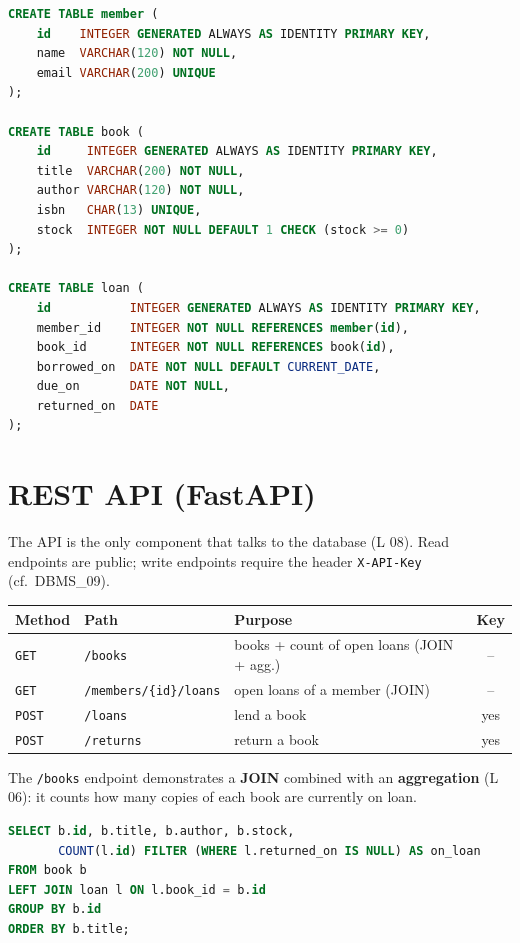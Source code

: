 \documentclass[11pt,a4paper]{article}
\begin{document}
\begin{lstlisting}[language=SQL, caption={init.sql (excerpt) -- schema and seed data}]
CREATE TABLE member (
    id    INTEGER GENERATED ALWAYS AS IDENTITY PRIMARY KEY,
    name  VARCHAR(120) NOT NULL,
    email VARCHAR(200) UNIQUE
);

CREATE TABLE book (
    id     INTEGER GENERATED ALWAYS AS IDENTITY PRIMARY KEY,
    title  VARCHAR(200) NOT NULL,
    author VARCHAR(120) NOT NULL,
    isbn   CHAR(13) UNIQUE,
    stock  INTEGER NOT NULL DEFAULT 1 CHECK (stock >= 0)
);

CREATE TABLE loan (
    id           INTEGER GENERATED ALWAYS AS IDENTITY PRIMARY KEY,
    member_id    INTEGER NOT NULL REFERENCES member(id),
    book_id      INTEGER NOT NULL REFERENCES book(id),
    borrowed_on  DATE NOT NULL DEFAULT CURRENT_DATE,
    due_on       DATE NOT NULL,
    returned_on  DATE
);
\end{lstlisting}

\section{REST API (FastAPI)}

The API is the only component that talks to the database (L 08). Read endpoints
are public; write endpoints require the header \texttt{X-API-Key} (cf.\ DBMS\_09).

\renewcommand{\arraystretch}{1.2}
\begin{tabularx}{\linewidth}{@{}p{1.6cm}p{4.4cm}Xc@{}}
\toprule
\textbf{Method} & \textbf{Path} & \textbf{Purpose} & \textbf{Key} \\
\midrule
\texttt{GET}  & \texttt{/books} & books + count of open loans (JOIN + agg.) & -- \\
\texttt{GET}  & \texttt{/members/\{id\}/loans} & open loans of a member (JOIN) & -- \\
\texttt{POST} & \texttt{/loans} & lend a book & yes \\
\texttt{POST} & \texttt{/returns} & return a book & yes \\
\bottomrule
\end{tabularx}

\medskip
The \texttt{/books} endpoint demonstrates a \textbf{JOIN} combined with an
\textbf{aggregation} (L 06): it counts how many copies of each book are
currently on loan.

\begin{lstlisting}[language=SQL, caption={Query behind GET /books (JOIN + aggregation)}]
SELECT b.id, b.title, b.author, b.stock,
       COUNT(l.id) FILTER (WHERE l.returned_on IS NULL) AS on_loan
FROM book b
LEFT JOIN loan l ON l.book_id = b.id
GROUP BY b.id
ORDER BY b.title;
\end{lstlisting}
\end{document}
